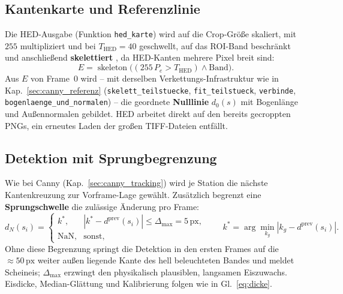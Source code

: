 \subsection{Kantenkarte und Referenzlinie}
\label{sec:hed_karte}

Die HED-Ausgabe (Funktion \texttt{hed\_karte}) wird auf die Crop-Größe skaliert,
mit $255$ multipliziert und bei $T_\mathrm{HED} = 40$ geschwellt, auf das ROI-Band
beschränkt und anschließend \textbf{skelettiert} \citep{zhang1984}, da HED-Kanten
mehrere Pixel breit sind:
\begin{equation}
  E = \operatorname{skeleton}\bigl( (255\,P_e > T_\mathrm{HED}) \wedge \text{Band}\bigr).
\end{equation}
Aus $E$ von Frame~0 wird -- mit derselben Verkettungs-Infrastruktur wie in
Kap.~\ref{sec:canny_referenz} (\texttt{skelett\_teilstuecke},
\texttt{fit\_teilstueck}, \texttt{verbinde}, \texttt{bogenlaenge\_und\_normalen})
-- die geordnete \textbf{Nulllinie} $d_0(s)$ mit Bogenlänge und Außennormalen
gebildet. HED arbeitet direkt auf den bereits gecroppten PNGs, ein erneutes Laden
der großen TIFF-Dateien entfällt.

\subsection{Detektion mit Sprungbegrenzung}
\label{sec:hed_detektion}

Wie bei Canny (Kap.~\ref{sec:canny_tracking}) wird je Station die nächste
Kantenkreuzung zur Vorframe-Lage gewählt. Zusätzlich begrenzt eine
\textbf{Sprungschwelle} die zulässige Änderung pro Frame:
\begin{equation}
  d_N(s_i) =
  \begin{cases}
    k^\ast, & |k^\ast - d^{\text{prev}}(s_i)| \le \Delta_{\max}=5\,\text{px},\\
    \text{NaN}, & \text{sonst},
  \end{cases}
  \qquad
  k^\ast = \arg\min_{k_g} |k_g - d^{\text{prev}}(s_i)| .
\end{equation}
Ohne diese Begrenzung springt die Detektion in den ersten Frames auf die
$\approx 50\,\text{px}$ weiter außen liegende Kante des hell beleuchteten Bandes
und meldet Scheineis; $\Delta_{\max}$ erzwingt den physikalisch plausiblen,
langsamen Eiszuwachs. Eisdicke, Median-Glättung und Kalibrierung folgen wie in
Gl.~\eqref{eq:dicke}.

